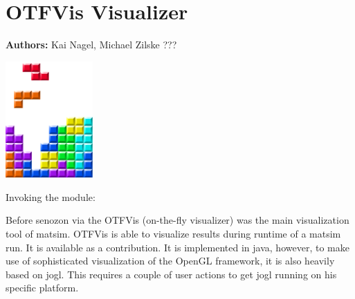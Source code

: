 \chapter{OTFVis Visualizer}
\label{ch:otfvis}

\hfill \textbf{Authors:} Kai Nagel, Michael Zilske ???

\begin{center} \includegraphics[width=0.25\textwidth, angle=0]{figures/MATSimBook.png} \end{center}


\begin{compactitem}
\item Invoking the module: 
\end{compactitem}

Before senozon via the OTFVis (on-the-fly visualizer) \citep[][]{Strippgen_PhDThesis_2009} was the main visualization tool of \gls{matsim}. OTFVis is able to visualize results during runtime of a \gls{matsim} run. It is available as a contribution. It is implemented in \gls{java}, however, to make use of sophisticated visualization of the OpenGL framework, it is also heavily based on jogl. This requires a couple of user actions to get jogl running on his specific platform. 







